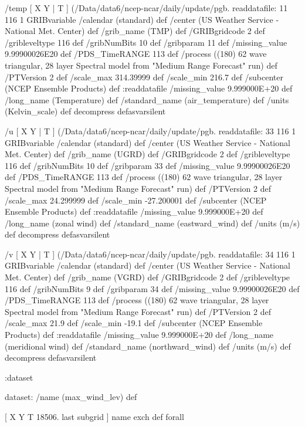 \begin{ingrid}
  /temp { [ X Y | T ] (/Data/data6/ncep-ncar/daily/update/pgb.%
  readdatafile:
  11 116 1 GRIBvariable
  /calendar (standard) def
  /center (US Weather Service - National Met. Center) def
  /grib_name (TMP) def
  /GRIBgridcode 2 def
  /gribleveltype 116 def
  /gribNumBits 10 def
  /gribparam 11 def
  /missing_value 9.99900026E20 def
  /PDS_TimeRANGE 113 def
  /process ((180) 62 wave triangular, 28 layer Spectral model from "Medium Range Forecast" run) def
  /PTVersion 2 def
  /scale_max 314.39999 def
  /scale_min 216.7 def
  /subcenter (NCEP Ensemble Products) def
  :readdatafile
  /missing_value 9.999000E+20 def
  /long_name (Temperature) def
  /standard_name (air_temperature) def
  /units (Kelvin_scale) def
  decompress
  } defasvarsilent

  /u { [ X Y | T ] (/Data/data6/ncep-ncar/daily/update/pgb.%
  readdatafile:
  33 116 1 GRIBvariable
  /calendar (standard) def
  /center (US Weather Service - National Met. Center) def
  /grib_name (UGRD) def
  /GRIBgridcode 2 def
  /gribleveltype 116 def
  /gribNumBits 10 def
  /gribparam 33 def
  /missing_value 9.99900026E20 def
  /PDS_TimeRANGE 113 def
  /process ((180) 62 wave triangular, 28 layer Spectral model from "Medium Range Forecast" run) def
  /PTVersion 2 def
  /scale_max 24.299999 def
  /scale_min -27.200001 def
  /subcenter (NCEP Ensemble Products) def
  :readdatafile
  /missing_value 9.999000E+20 def
  /long_name (zonal wind) def
  /standard_name (eastward_wind) def
  /units (m/s) def
  decompress
  } defasvarsilent

  /v { [ X Y | T ] (/Data/data6/ncep-ncar/daily/update/pgb.%
  readdatafile:
  34 116 1 GRIBvariable
  /calendar (standard) def
  /center (US Weather Service - National Met. Center) def
  /grib_name (VGRD) def
  /GRIBgridcode 2 def
  /gribleveltype 116 def
  /gribNumBits 9 def
  /gribparam 34 def
  /missing_value 9.99900026E20 def
  /PDS_TimeRANGE 113 def
  /process ((180) 62 wave triangular, 28 layer Spectral model from "Medium Range Forecast" run) def
  /PTVersion 2 def
  /scale_max 21.9 def
  /scale_min -19.1 def
  /subcenter (NCEP Ensemble Products) def
  :readdatafile
  /missing_value 9.999000E+20 def
  /long_name (meridional wind) def
  /standard_name (northward_wind) def
  /units (m/s) def
  decompress
  } defasvarsilent

 :dataset

 dataset: /name (max_wind_lev) def 

  [ X Y T 18506. last subgrid ] { name exch def } forall


\end{ingrid}
